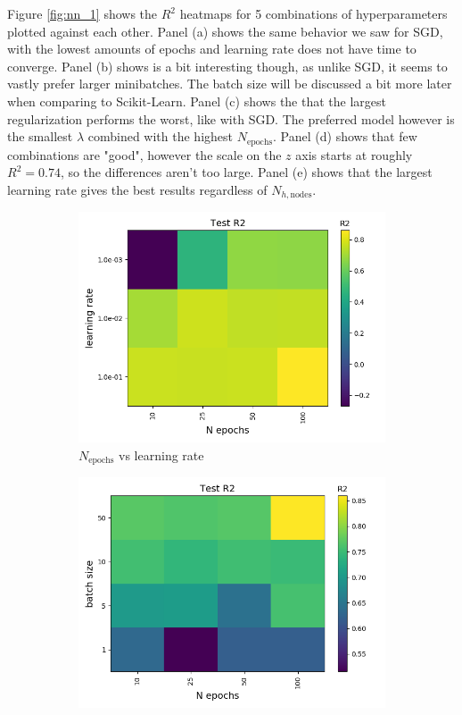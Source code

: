 \documentclass[a4paper]{article}
\newcommand{\Nepochs}{N_{\text{epochs}}}
\newcommand{\Nhn}{N_{h,\text{nodes}}}
\begin{document}
Figure \ref{fig:nn_1} shows the $R^2$ heatmaps for 5 combinations of hyperparameters plotted against each other. Panel (a) shows the same behavior we saw for SGD, with the lowest amounts of epochs and learning rate does not have time to converge. Panel (b) shows is a bit interesting though, as unlike SGD, it seems to vastly prefer larger minibatches. The batch size will be discussed a bit more later when comparing to Scikit-Learn. Panel (c) shows the that the largest regularization performs the worst, like with SGD. The preferred model however is the smallest $\lambda$ combined with the highest $\Nepochs$. Panel (d) shows that few combinations are "good", however the scale on the $z$ axis starts at roughly $R^2 = 0.74$, so the differences aren't too large. Panel (e) shows that the largest learning rate gives the best results regardless of $\Nhn$.
\begin{figure}[H]
  \centering
  \begin{subfigure}{0.49\textwidth}
    \includegraphics[scale=0.45]{../figures/task_b/test/heatmap_test_lr_constant_Nhyp443431_R2_n_epochs_eta0.png}
    \caption{$\Nepochs$ vs learning rate}
  \end{subfigure}
  \begin{subfigure}{0.49\textwidth}
    \includegraphics[scale=0.45]{../figures/task_b/test/heatmap_test_lr_constant_Nhyp443431_R2_n_epochs_bsize.png}

\end{subfigure}
\end{figure}
\end{document}
